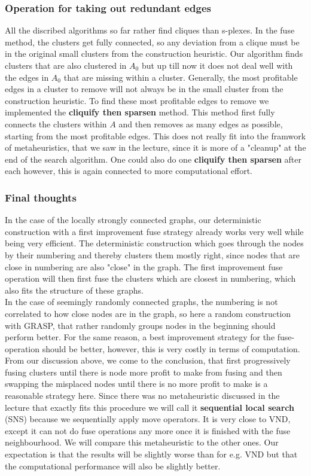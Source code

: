 \subsubsection{Operation for taking out redundant edges}
\label{sec:cliquify}
All the discribed algorithms so far rather find cliques than s-plexes. In the fuse method, the clusters get fully connected, so any deviation from a clique must be in the original small clusters from the construction heuristic. Our algorithm finds clusters that are also clustered in $A_0$ but up till now it does not deal well with the edges in $A_0$ that are missing within a cluster. Generally, the most profitable edges in a cluster to remove will not always be in the small cluster from the construction heuristic. To find these most profitable edges to remove we implemented the \textbf{cliquify then sparsen} method. This method first fully connects the clusters within $A$ and then removes as many edges as possible, starting from the most profitable edges. This does not really fit into the framwork of metaheuristics, that we saw in the lecture, since it is more of a "cleanup" at the end of the search algorithm. One could also do one \textbf{cliquify then sparsen} after each however, this is again connected to more computational effort.\\
\subsubsection{Final thoughts}
In the case of the locally strongly connected graphs, our deterministic construction with a first improvement fuse strategy already works very well while being very efficient. The deterministic construction which goes through the nodes by their numbering and thereby clusters them mostly right, since nodes that are close in numbering are also "close" in the graph. The first improvement fuse operation will then first fuse the clusters which are closest in numbering, which also fits the structure of these graphs.\\
In the case of seemingly randomly connected graphs, the numbering is not correlated to how close nodes are in the graph, so here a random construction with GRASP, that rather randomly groups nodes in the beginning should perform better. For the same reason, a best improvement strategy for the fuse-operation should be better, however, this is very costly in terms of computation.\\
From our discussion above, we come to the conclusion, that first progressively fusing clusters until there is node more profit to make from fusing and then swapping the misplaced nodes until there is no more profit to make is a reasonable strategy here. Since there was no metaheuristic discussed in the lecture that exactly fits this procedure we will call it \textbf{sequential local search} (SNS) because we sequentially apply move operators. It is very close to VND, except it can not do fuse operations any more once it is finished with the fuse neighbourhood. We will compare this metaheuristic to the other ones. Our expectation is that the results will be slightly worse than for e.g. VND but that the computational performance will also be slightly better.\\
